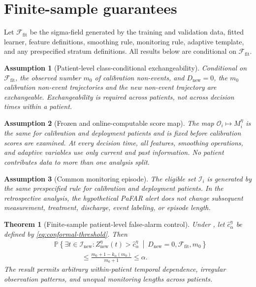\documentclass[11pt]{article}
\newtheorem{assumption}{Assumption}
\newtheorem{theorem}{Theorem}
\newcommand{\Pp}{\mathbb{P}}
\newcommand{\calI}{\mathcal{I}}
\newcommand{\calF}{\mathcal{F}}
\begin{document}
\section{Finite-sample guarantees}\label{sec:theory}

Let $\calF_{\mathrm{fit}}$ be the sigma-field generated by the training and validation data, fitted learner, feature definitions, smoothing rule, monitoring rule, adaptive template, and any prespecified stratum definitions. All results below are conditional on $\calF_{\mathrm{fit}}$.

\begin{assumption}[Patient-level class-conditional exchangeability]\label{ass:exchangeability}
Conditional on $\calF_{\mathrm{fit}}$, the observed number $m_0$ of calibration non-events, and $D_{\mathrm{new}}=0$, the $m_0$ calibration non-event trajectories and the new non-event trajectory are exchangeable. Exchangeability is required across patients, not across decision times within a patient.
\end{assumption}

\begin{assumption}[Frozen and online-computable score map]\label{ass:frozen}
The map $\mathcal O_i\mapsto M_i^{\eta}$ is the same for calibration and deployment patients and is fixed before calibration scores are examined. At every decision time, all features, smoothing operations, and adaptive variables use only current and past information. No patient contributes data to more than one analysis split.
\end{assumption}

\begin{assumption}[Common monitoring episode]\label{ass:stable-episode}
The eligible set $\calI_i$ is generated by the same prespecified rule for calibration and deployment patients. In the retrospective analysis, the hypothetical PaFAR alert does not change subsequent measurement, treatment, discharge, event labeling, or episode length.
\end{assumption}

\begin{theorem}[Finite-sample patient-level false-alarm control]\label{thm:marginal}
Under , let $\widehat c_{\alpha}^{\eta}$ be defined by \eqref{eq:conformal-threshold}. Then
\begin{align}
&\Pp\left\{\exists t\in\calI_{\mathrm{new}}:
Z_{\mathrm{new}}^{\eta}(t)>\widehat c_{\alpha}^{\eta}
\ \middle|\ D_{\mathrm{new}}=0,\calF_{\mathrm{fit}},m_0\right\}
\nonumber\\
&\hspace{4em}\le
\frac{m_0+1-k_{\alpha}(m_0)}{m_0+1}
\le\alpha.
\label{eq:theorem-marginal}
\end{align}
The result permits arbitrary within-patient temporal dependence, irregular observation patterns, and unequal monitoring lengths across patients.
\end{theorem}
\end{document}
